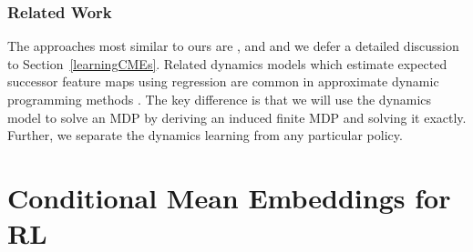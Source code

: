 \documentclass[letterpaper]{article}
\newcommand{\CsabaFLAM}{DBLP:conf/adprl/YaoSPZ14}
\newcommand{\GrunewalderEmbeddingsRL}{GrunewalderEmbeddingsMDP}
\newcommand{\ParrLinear}{DBLP:conf/icml/ParrLTPL08}
\newcommand{\KroemerNonParametric}{DBLP:conf/nips/KroemerP11}
\newcommand{\DeisenrothPilco}{DBLP:conf/icml/DeisenrothR11}
\newcommand{\OrmoneitKBRL}{DBLP:journals/ml/OrmoneitS02}
\begin{document}
\subsubsection{Related Work}
The approaches most similar to ours are \cite{\OrmoneitKBRL}, \cite{\GrunewalderEmbeddingsRL} and \cite{\CsabaFLAM} and we defer a detailed discussion to Section~\ref{learningCMEs}. Related dynamics models which estimate expected successor feature maps using regression are common in approximate dynamic programming methods \citep[e.g.][]{\ParrLinear}. The key difference is that we will use the dynamics model to solve an MDP by deriving an induced finite MDP and solving it exactly. Further, we separate the dynamics learning from any particular policy.



\section{Conditional Mean Embeddings for RL} \label{CMEsforRL}
\end{document}
